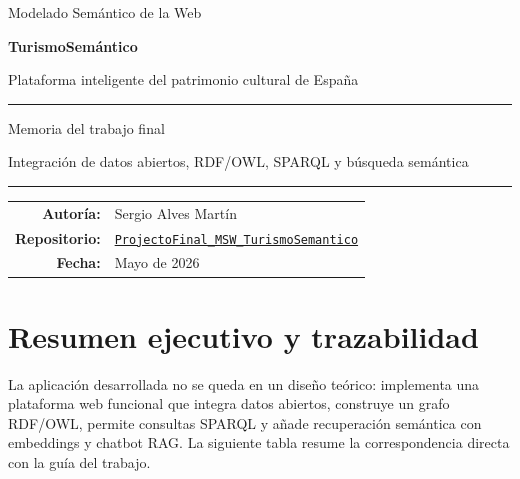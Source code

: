 \documentclass[10pt,a4paper]{article}
\newcommand{\proyecto}{TurismoSemántico}
\newcommand{\asignatura}{Modelado Semántico de la Web}
\newcommand{\autor}{Sergio Alves Martín}
\newcommand{\fechaentrega}{Mayo de 2026}
\begin{document}
\begin{titlepage}
\centering
\vspace*{1.2cm}
{\Large \asignatura\par}
\vspace{1.8cm}
{\Huge\bfseries \proyecto\par}
\vspace{0.35cm}
{\Large Plataforma inteligente del patrimonio cultural de España\par}
\vspace{1.4cm}
\rule{0.78\textwidth}{0.6pt}\par
\vspace{0.7cm}
{\large Memoria del trabajo final\par}
\vspace{0.35cm}
{\large Integración de datos abiertos, RDF/OWL, SPARQL y búsqueda semántica\par}
\vspace{0.7cm}
\rule{0.78\textwidth}{0.6pt}\par
\vfill
\begin{tabular}{rl}
\textbf{Autoría:} & \autor\\
\textbf{Repositorio:} & \href{https://github.com/SergioAlvesMar5/ProjectoFinal_MSW_TurismoSemantico}{\texttt{ProjectoFinal\_MSW\_TurismoSemantico}}\\
\textbf{Fecha:} & \fechaentrega\\
\end{tabular}
\vfill
\end{titlepage}

\tableofcontents
\vspace{0.4cm}

\section*{Resumen ejecutivo y trazabilidad}

La aplicación desarrollada no se queda en un diseño teórico: implementa una plataforma web funcional que integra datos abiertos, construye un grafo RDF/OWL, permite consultas SPARQL y añade recuperación semántica con embeddings y chatbot RAG. La siguiente tabla resume la correspondencia directa con la guía del trabajo.
\end{document}
